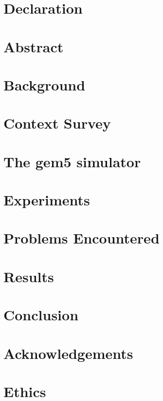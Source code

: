 \documentclass[12pt]{report}
\begin{document}
    
    
    
    \chapter*{Declaration}
    
    
    \chapter*{Abstract}
    
    
    \tableofcontents
    
    \chapter{Background}
    
    
    \chapter{Context Survey}
    
    
    \chapter{The gem5 simulator}
    
    
    \chapter{Experiments}
    
    
    \chapter{Problems Encountered}
    
    
    \chapter{Results}
    
    
    \chapter{Conclusion}
    
    
    \chapter*{Acknowledgements}
    
    
    \printbibliography
    
    \appendix
    
    \chapter{Ethics}
    
\end{document}
